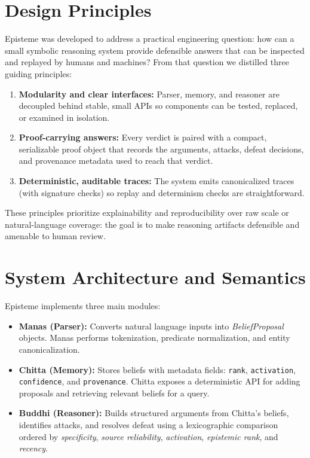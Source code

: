 \documentclass[11pt]{article}
\begin{document}
\section{Design Principles}
Episteme was developed to address a practical engineering question: how can a
small symbolic reasoning system provide defensible answers that can be inspected
and replayed by humans and machines? From that question we distilled three guiding
principles:
\begin{enumerate}
  \item \textbf{Modularity and clear interfaces:} Parser, memory, and reasoner are
    decoupled behind stable, small APIs so components can be tested, replaced, or
    examined in isolation.
  \item \textbf{Proof-carrying answers:} Every verdict is paired with a compact,
    serializable proof object that records the arguments, attacks, defeat decisions,
    and provenance metadata used to reach that verdict.
  \item \textbf{Deterministic, auditable traces:} The system emits canonicalized
    traces (with signature checks) so replay and determinism checks are straightforward.
\end{enumerate}

These principles prioritize explainability and reproducibility over raw scale or
natural-language coverage: the goal is to make reasoning artifacts defensible and
amenable to human review.

\section{System Architecture and Semantics}
Episteme implements three main modules:
\begin{itemize}
  \item \textbf{Manas (Parser):} Converts natural language inputs into \emph{BeliefProposal}
    objects. Manas performs tokenization, predicate normalization, and entity canonicalization.
  \item \textbf{Chitta (Memory):} Stores beliefs with metadata fields: \texttt{rank},
    \texttt{activation}, \texttt{confidence}, and \texttt{provenance}. Chitta exposes a
    deterministic API for adding proposals and retrieving relevant beliefs for a query.
  \item \textbf{Buddhi (Reasoner):} Builds structured arguments from Chitta's beliefs,
    identifies attacks, and resolves defeat using a lexicographic comparison ordered by
    \emph{specificity}, \emph{source reliability}, \emph{activation}, \emph{epistemic rank}, and \emph{recency}.
\end{itemize}
\end{document}
